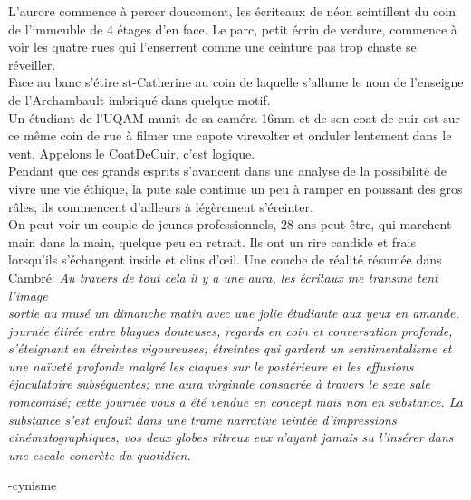 L’aurore commence à percer
doucement, les écriteaux de néon scintillent du coin de l’immeuble de
4 étages d’en face. Le parc, petit écrin de verdure, commence à voir
les quatre rues qui l’enserrent comme une ceinture pas trop chaste se
réveiller. \\

Face au banc s’étire st-Catherine au coin de laquelle
s’allume le nom de l’enseigne de l’Archambault imbriqué dans quelque
motif.\\

Un étudiant de l’UQAM munit de sa caméra 16mm et de son coat de
cuir est sur ce même coin de rue à filmer une capote virevolter et
onduler lentement dans le vent. Appelons le CoatDeCuir, c’est
logique.\\

Pendant que ces grands esprits s'avancent dans une analyse de la
possibilité de vivre une vie éthique, la pute sale continue un peu à
ramper en poussant des gros râles, ils commencent d’ailleurs à
légèrement s’éreinter.\\

On peut voir un couple de jeunes
professionnels, 28 ans peut-être, qui marchent main dans la main,
quelque peu en retrait. Ils ont un rire candide et frais lorsqu’ils
s’échangent inside et clins d’œil. Une couche de réalité résumée dans\\

Cambré: \textit{Au travers de tout cela il y a une aura, les écritaux me transme
    tent l'image \\[1ex]
    sortie au musé un dimanche matin avec une jolie étudiante aux yeux en
    amande, journée étirée entre blagues douteuses, regards en coin et
    conversation profonde, s’éteignant en étreintes vigoureuses; étreintes
    qui gardent un sentimentalisme et une naïveté profonde malgré les
    claques sur le postérieure et les effusions éjaculatoire subséquentes;
    une aura virginale consacrée à travers le sexe sale romcomisé;
    cette journée vous a été vendue en concept mais non en substance. La
    substance s’est enfouit dans une trame narrative teintée d’impressions
    cinématographiques, vos deux globes vitreux eux n’ayant jamais su
    l’insérer dans une escale concrète du quotidien.}

\hspace{3em}-cynisme \\

